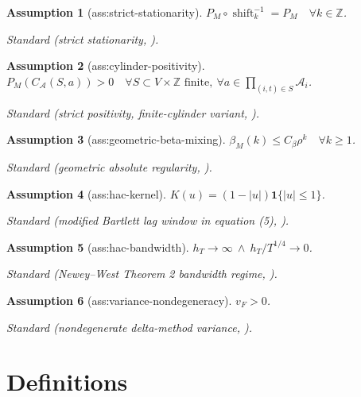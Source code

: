 \documentclass{article}
\newtheorem{assumption}{Assumption}
\begin{document}
\begin{assumption}[ass:strict-stationarity]\label{ass:strict-stationarity}
\(P_M\circ\operatorname{shift}_{k}^{-1}=P_M\quad\forall k\in\mathbb Z\).
\par\smallskip\noindent\emph{Standard} (strict stationarity, \cite{VivianoBradic2023}).
\end{assumption}

\begin{assumption}[ass:cylinder-positivity]\label{ass:cylinder-positivity}
\(P_M(C_{\mathcal A}(S,a))>0\quad\forall S\subset V\times\mathbb Z\text{ finite},\ \forall a\in\prod_{(i,t)\in S}\mathcal A_i\).
\par\smallskip\noindent\emph{Standard} (strict positivity, finite-cylinder variant, \cite{Assaad2025MicroSCGFrontDoor}).
\end{assumption}

\begin{assumption}[ass:geometric-beta-mixing]\label{ass:geometric-beta-mixing}
\(\beta_M(k)\le C_\beta\rho^k\quad\forall k\ge1\).
\par\smallskip\noindent\emph{Standard} (geometric absolute regularity, \cite{VivianoBradic2023}).
\end{assumption}

\begin{assumption}[ass:hac-kernel]\label{ass:hac-kernel}
\(K(u)=(1-|u|)\mathbf 1\{|u|\le1\}\).
\par\smallskip\noindent\emph{Standard} (modified Bartlett lag window in equation (5), \cite{NeweyWest1987}).
\end{assumption}

\begin{assumption}[ass:hac-bandwidth]\label{ass:hac-bandwidth}
\(h_T\to\infty\ \wedge\ h_T/T^{1/4}\to0\).
\par\smallskip\noindent\emph{Standard} (Newey--West Theorem 2 bandwidth regime, \cite{NeweyWest1987}).
\end{assumption}

\begin{assumption}[ass:variance-nondegeneracy]\label{ass:variance-nondegeneracy}
\(v_F>0\).
\par\smallskip\noindent\emph{Standard} (nondegenerate delta-method variance, \cite{NeweyWest1987}).
\end{assumption}

\section{Definitions}
\end{document}
